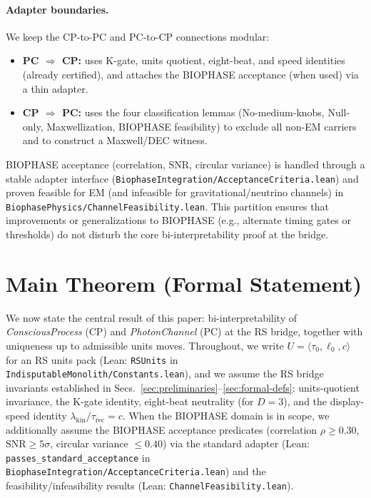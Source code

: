 \documentclass[12pt,a4paper]{article}
\begin{document}
\paragraph{Adapter boundaries.}
We keep the CP-to-PC and PC-to-CP connections modular:
\begin{itemize}
  \item \textbf{PC \(\Rightarrow\) CP:} uses K-gate, units quotient, eight-beat, and speed identities (already certified), and attaches the BIOPHASE acceptance (when used) via a thin adapter.
  \item \textbf{CP \(\Rightarrow\) PC:} uses the four classification lemmas (No-medium-knobs, Null-only, Maxwellization, BIOPHASE feasibility) to exclude all non-EM carriers and to construct a Maxwell/DEC witness.
\end{itemize}
BIOPHASE acceptance (correlation, SNR, circular variance) is handled through a stable adapter interface (\texttt{BiophaseIntegration/AcceptanceCriteria.lean}) and proven feasible for EM (and infeasible for gravitational/neutrino channels) in \texttt{BiophasePhysics/ChannelFeasibility.lean}. This partition ensures that improvements or generalizations to BIOPHASE (e.g., alternate timing gates or thresholds) do not disturb the core bi-interpretability proof at the bridge.

\section{Main Theorem (Formal Statement)}
\label{sec:main-theorem}

We now state the central result of this paper: bi-interpretability of \emph{ConsciousProcess} (CP) and \emph{PhotonChannel} (PC) at the RS bridge, together with uniqueness up to admissible units moves. Throughout, we write \(U=\langle \tau_0,\ell_0,c\rangle\) for an RS units pack (Lean: \texttt{RSUnits} in \texttt{IndisputableMonolith/Constants.lean}), and we assume the RS bridge invariants established in Secs.~\ref{sec:preliminaries}--\ref{sec:formal-defs}: units-quotient invariance, the K-gate identity, eight-beat neutrality (for \(D{=}3\)), and the display-speed identity \(\lambda_{\mathrm{kin}}/\tau_{\mathrm{rec}}=c\). When the BIOPHASE domain is in scope, we additionally assume the BIOPHASE acceptance predicates (correlation \(\rho\ge 0.30\), \(\mathrm{SNR}\ge 5\sigma\), circular variance \(\le 0.40\)) via the standard adapter (Lean: \texttt{passes\_standard\_acceptance} in \texttt{BiophaseIntegration/AcceptanceCriteria.lean}) and the feasibility/infeasibility results (Lean: \texttt{ChannelFeasibility.lean}).
\end{document}

